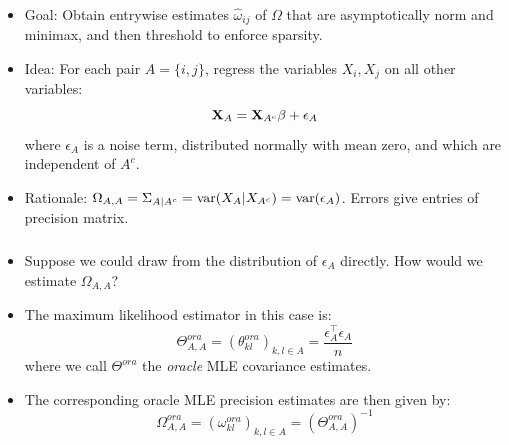 \begin{frame}[fragile] \frametitle{}
    \begin{itemize}
        \item Goal: Obtain entrywise estimates $\hat\omega_{ij}$ of $\Omega$
            that are asymptotically norm and minimax, and then threshold to
            enforce sparsity.
        \item Idea: For each pair $A = \{i, j\}$, regress the variables $X_i,
            X_j$ on all other variables:
            $$
            \mathbf{X}_A = \mathbf{X}_{A^c}\beta + \epsilon_A
            $$
            where $\epsilon_A$ is a noise term, distributed normally with mean
            zero, and which are independent of $A^c$.
        \item Rationale: $\Omega_{A, A} = \Sigma_{A|A^c} = \operatorname{\mathrm{var}}(X_A|X_{A^c})
            = \operatorname{\mathrm{var}}(\epsilon_A)$.  Errors give entries of precision matrix.
    \end{itemize}
\end{frame}
\begin{frame}[fragile] \frametitle{}

    \begin{itemize}
        \item Suppose we could draw from the distribution of $\epsilon_A$
            directly.  How would we estimate $\Omega_{A, A}$?  
        \item The maximum likelihood estimator in this case is:
            $$
            \Theta^{ora}_{A, A} = (\theta^{ora}_{kl})_{k, l \in A}
            = \frac{\epsilon_A^\top\epsilon_A}{n}
            $$
            where we call $\Theta^{ora}$ the \textit{oracle} MLE covariance estimates.
        \item The corresponding oracle MLE precision estimates are then given
            by:
            $$
            \Omega^{ora}_{A, A} = (\omega^{ora}_{kl})_{k, l \in A}
                = \left(\Theta^{ora}_{A, A}\right)^{-1}
            $$
    \end{itemize}
\end{frame}
